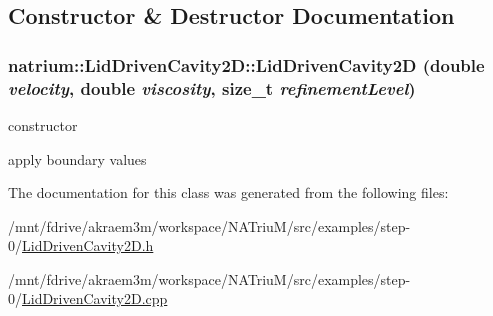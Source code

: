 \subsection{Constructor \& Destructor Documentation}
\hypertarget{classnatrium_1_1LidDrivenCavity2D_a139fe700f3e871e1b51eada1a41c69b1}{
\subsubsection[{LidDrivenCavity2D}]{\setlength{\rightskip}{0pt plus 5cm}natrium::LidDrivenCavity2D::LidDrivenCavity2D (double {\em velocity}, \/  double {\em viscosity}, \/  size\_\-t {\em refinementLevel})}}
\label{classnatrium_1_1LidDrivenCavity2D_a139fe700f3e871e1b51eada1a41c69b1}


constructor 

apply boundary values 

The documentation for this class was generated from the following files:\begin{DoxyCompactItemize}
\item 
/mnt/fdrive/akraem3m/workspace/NATriuM/src/examples/step-\/0/\hyperlink{LidDrivenCavity2D_8h}{LidDrivenCavity2D.h}\item 
/mnt/fdrive/akraem3m/workspace/NATriuM/src/examples/step-\/0/\hyperlink{LidDrivenCavity2D_8cpp}{LidDrivenCavity2D.cpp}\end{DoxyCompactItemize}
